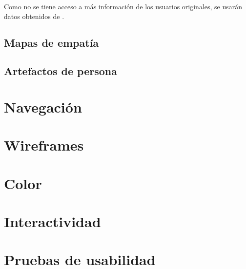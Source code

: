 \documentclass[titlepage]{article}
\begin{document}
Como no se tiene acceso a más información de los usuarios originales, se usarán
datos obtenidos de \cite{PEU}.

\subsection{Mapas de empatía}

\subsection{Artefactos de persona}

\section{Navegación}

\section{Wireframes}

\section{Color}

\section{Interactividad}

\section{Pruebas de usabilidad}

\printbibliography
\end{document}
